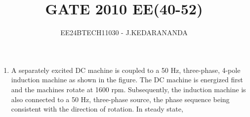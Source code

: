 \documentclass[journal]{IEEEtran}
\renewcommand{\thefigure}{\theenumi}
\renewcommand{\thetable}{\theenumi}
\numberwithin{equation}{enumi}
\numberwithin{figure}{enumi}
\renewcommand{\thetable}{\theenumi}
\begin{document}

\vspace{3cm}

\title{GATE 2010 EE(40-52)}
\author{EE24BTECH11030 - J.KEDARANANDA}
{\let\newpage\relax\maketitle}
\renewcommand{\thefigure}{\theenumi}
\renewcommand{\thetable}{\theenumi}
\begin{enumerate}
    \item A separately excited DC machine is coupled to a 50 Hz, three-phase, 4-pole induction machine as shown in the figure. The DC machine is energized first and the machines rotate at 1600 rpm. Subsequently, the induction machine is also connected to a 50 Hz, three-phase source, the phase sequence being consistent with the direction of rotation. In steady state,


\end{enumerate}
\end{document}
